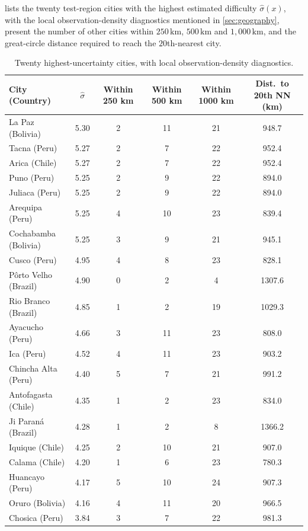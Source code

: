 \documentclass[11pt,a4paper]{report}
\begin{document}
 lists the twenty test-region cities with the highest estimated difficulty $\hat\sigma(x)$, with the local observation-density diagnostics mentioned in \cref{sec:geography}, present the number of other cities within $250\,\mathrm{km}$, $500\,\mathrm{km}$ and $1{,}000\,\mathrm{km}$, and the great-circle distance required to reach the $20$th-nearest city.
\begin{table}[H]
\centering
\caption{Twenty highest-uncertainty cities, with local observation-density diagnostics.}
\label{tab:appendix-cities}
\scriptsize
\begin{tabular}{lccccc}
\toprule
City (Country) & $\hat\sigma$ & Within 250 km & Within 500 km & Within 1000 km & Dist.\ to 20th NN (km) \\
\midrule
La Paz (Bolivia) & 5.30 & 2 & 11 & 21 & 948.7 \\
Tacna (Peru) & 5.27 & 2 & 7 & 22 & 952.4 \\
Arica (Chile) & 5.27 & 2 & 7 & 22 & 952.4 \\
Puno (Peru) & 5.25 & 2 & 9 & 22 & 894.0 \\
Juliaca (Peru) & 5.25 & 2 & 9 & 22 & 894.0 \\
Arequipa (Peru) & 5.25 & 4 & 10 & 23 & 839.4 \\
Cochabamba (Bolivia) & 5.25 & 3 & 9 & 21 & 945.1 \\
Cusco (Peru) & 4.95 & 4 & 8 & 23 & 828.1 \\
P\^orto Velho (Brazil) & 4.90 & 0 & 2 & 4 & 1307.6 \\
Rio Branco (Brazil) & 4.85 & 1 & 2 & 19 & 1029.3 \\
Ayacucho (Peru) & 4.66 & 3 & 11 & 23 & 808.0 \\
Ica (Peru) & 4.52 & 4 & 11 & 23 & 903.2 \\
Chincha Alta (Peru) & 4.40 & 5 & 7 & 21 & 991.2 \\
Antofagasta (Chile) & 4.35 & 1 & 2 & 23 & 834.0 \\
Ji Paran\'a (Brazil) & 4.28 & 1 & 2 & 8 & 1366.2 \\
Iquique (Chile) & 4.25 & 2 & 10 & 21 & 907.0 \\
Calama (Chile) & 4.20 & 1 & 6 & 23 & 780.3 \\
Huancayo (Peru) & 4.17 & 5 & 10 & 24 & 907.3 \\
Oruro (Bolivia) & 4.16 & 4 & 11 & 20 & 966.5 \\
Chosica (Peru) & 3.84 & 3 & 7 & 22 & 981.3 \\
\bottomrule
\end{tabular}
\end{table}
\end{document}
